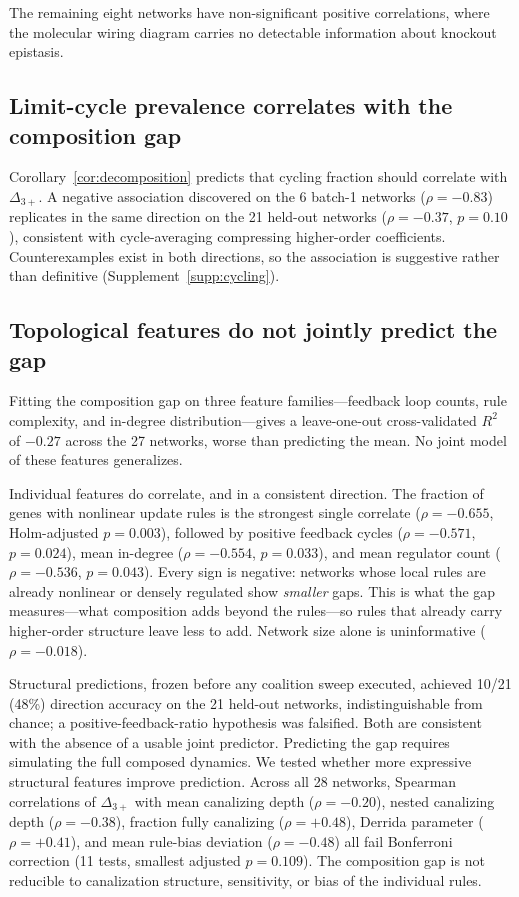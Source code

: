 \documentclass[10pt]{article}
\begin{document}
The remaining eight networks have non-significant positive
correlations, where the molecular wiring diagram carries no detectable
information about knockout epistasis.


\subsection{Limit-cycle prevalence correlates with the composition gap}
\label{sec:cycling}

Corollary~\ref{cor:decomposition} predicts that cycling fraction
should correlate with $\Delta_{3+}$. A negative association
discovered on the 6 batch-1 networks ($\rho = -0.83$) replicates in
the same direction on the 21 held-out networks ($\rho = -0.37$,
$p = 0.10$), consistent with cycle-averaging compressing
higher-order coefficients. Counterexamples exist in both directions,
so the association is suggestive rather than definitive
(Supplement~\ref{supp:cycling}).


\subsection{Topological features do not jointly predict the gap}
\label{sec:blind-results}

Fitting the composition gap on three feature families---feedback
loop counts, rule complexity, and in-degree distribution---gives a leave-one-out cross-validated $R^2$ of $-0.27$
across the 27 networks, worse than predicting the mean. No joint model
of these features generalizes.

Individual features do correlate, and in a consistent direction. The
fraction of genes with nonlinear update rules is the strongest single
correlate ($\rho = -0.655$, Holm-adjusted $p = 0.003$), followed by
positive feedback cycles ($\rho = -0.571$, $p = 0.024$), mean
in-degree ($\rho = -0.554$, $p = 0.033$), and mean regulator count
($\rho = -0.536$, $p = 0.043$). Every sign is negative: networks whose
local rules are already nonlinear or densely regulated show
\emph{smaller} gaps. This is what the gap measures---what composition
adds beyond the rules---so rules that already carry higher-order
structure leave less to add. Network size alone is uninformative
($\rho = -0.018$).

Structural predictions, frozen before any coalition sweep executed,
achieved 10/21 (48\%) direction accuracy on the 21 held-out
networks, indistinguishable from chance; a positive-feedback-ratio
hypothesis was falsified. Both are consistent with the absence of a
usable joint predictor. Predicting the
gap requires simulating the full
composed dynamics. We tested whether more expressive structural
features improve prediction. Across all 28 networks, Spearman
correlations of $\Delta_{3+}$ with mean canalizing depth
($\rho = -0.20$), nested canalizing depth ($\rho = -0.38$),
fraction fully canalizing ($\rho = +0.48$), Derrida parameter
($\rho = +0.41$), and mean rule-bias deviation ($\rho = -0.48$)
all fail Bonferroni correction (11 tests, smallest adjusted
$p = 0.109$). The composition gap is not reducible to canalization
structure, sensitivity, or bias of the individual rules.
\end{document}

